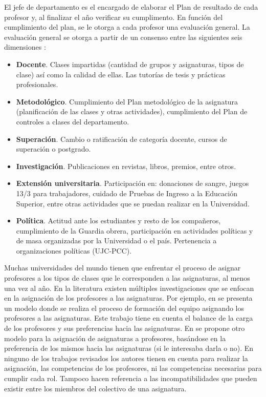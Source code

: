 El jefe de departamento es el encargado de elaborar el Plan de resultado de cada profesor y, al finalizar el año verificar su cumplimento. En función del cumplimiento del plan, se le otorga a cada profesor una evaluación general. La evaluación general se otorga a partir de un consenso entre las siguientes seis dimensiones \citep{Ansola2020}:
\begin{itemize}
	\item \textbf{Docente}. Clases impartidas (cantidad de grupos y asignaturas, tipos de clase) así como la calidad de ellas. Las tutorías de tesis y prácticas profesionales.
	\item \textbf{Metodológico}. Cumplimiento del Plan metodológico de la asignatura (planificación de las clases y otras actividades), cumplimiento del Plan de controles a clases del departamento.
	\item \textbf{Superación}. Cambio o ratificación de categoría docente, cursos de superación o postgrado.
	\item \textbf{Investigación}. Publicaciones en revistas, libros, premios, entre otros.
	\item \textbf{Extensión universitaria}. Participación en: donaciones de sangre, juegos 13/3 para trabajadores, cuidado de Pruebas de Ingreso a la Educación Superior, entre otras actividades que se puedan realizar en la Universidad.
	\item \textbf{Política}. Actitud ante los estudiantes y resto de los compañeros, cumplimiento de la Guardia obrera, participación en actividades políticas y de masa organizadas por la Universidad o el país. Pertenencia a organizaciones políticas (UJC-PCC).
\end{itemize}

Muchas universidades del mundo tienen que enfrentar el proceso de asignar profesores a los tipos de clases que le corresponden a las asignaturas, al menos una vez al año. En la literatura existen múltiples investigaciones que se enfocan en la asignación de los profesores a las asignaturas. Por ejemplo, en \cite{Domenech2014} se presenta un modelo donde se realiza el proceso de formación del equipo asignando los profesores a las asignaturas. Este trabajo tiene en cuenta el balance de la carga de los profesores y sus preferencias hacia las asignaturas. En \cite{Bosquez2020} se propone otro modelo para la asignación de asignaturas a profesores, basándose en la preferencia de los mismos hacia las asignaturas (si le interesaba darla o no). En ninguno de los trabajos revisados los autores tienen en cuenta para realizar la asignación, las competencias de los profesores, ni las competencias necesarias para cumplir cada rol. Tampoco hacen referencia a las incompatibilidades que pueden existir entre los miembros del colectivo de una asignatura.

